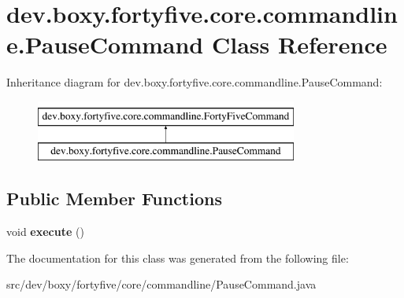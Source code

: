 \hypertarget{classdev_1_1boxy_1_1fortyfive_1_1core_1_1commandline_1_1_pause_command}{
\section{dev.boxy.fortyfive.core.commandline.PauseCommand Class Reference}
\label{d6/d15/classdev_1_1boxy_1_1fortyfive_1_1core_1_1commandline_1_1_pause_command}
}
Inheritance diagram for dev.boxy.fortyfive.core.commandline.PauseCommand:\begin{figure}[H]
\begin{center}
\leavevmode
\includegraphics[height=2.000000cm]{d6/d15/classdev_1_1boxy_1_1fortyfive_1_1core_1_1commandline_1_1_pause_command}
\end{center}
\end{figure}
\subsection*{Public Member Functions}
\begin{DoxyCompactItemize}
\item 
\hypertarget{classdev_1_1boxy_1_1fortyfive_1_1core_1_1commandline_1_1_pause_command_a752da523c5c5144668d827d1f820e3f7}{
void {\bfseries execute} ()}
\label{d6/d15/classdev_1_1boxy_1_1fortyfive_1_1core_1_1commandline_1_1_pause_command_a752da523c5c5144668d827d1f820e3f7}

\end{DoxyCompactItemize}


The documentation for this class was generated from the following file:\begin{DoxyCompactItemize}
\item 
src/dev/boxy/fortyfive/core/commandline/PauseCommand.java\end{DoxyCompactItemize}
